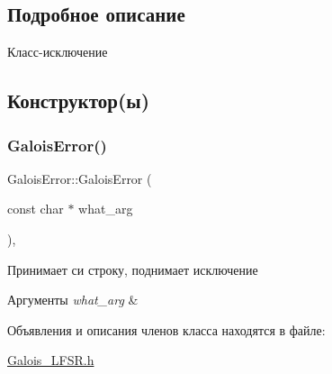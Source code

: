 \subsection{Подробное описание}
Класс-\/исключение 

\subsection{Конструктор(ы)}
\mbox{\label{classGaloisError_a23edc44b479adce2d5d7869d39807575}} 
\subsubsection{\texorpdfstring{Galois\+Error()}{GaloisError()}}
{\footnotesize\ttfamily Galois\+Error\+::\+Galois\+Error (\begin{DoxyParamCaption}\item[{const char $\ast$}]{what\+\_\+arg }\end{DoxyParamCaption})\hspace{0.3cm}{\ttfamily [inline]}, {\ttfamily [explicit]}}



Принимает си строку, поднимает исключение 


\begin{DoxyParams}{Аргументы}
{\em what\+\_\+arg} & \\
\hline
\end{DoxyParams}


Объявления и описания членов класса находятся в файле\+:\begin{DoxyCompactItemize}
\item 
\hyperlink{Galois__LFSR_8h}{Galois\+\_\+\+L\+F\+S\+R.\+h}\end{DoxyCompactItemize}
